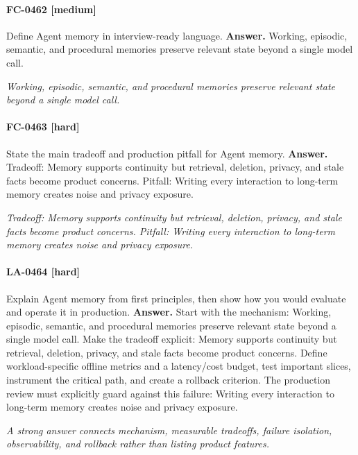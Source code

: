\paragraph{FC-0462 [medium]} Define Agent memory in interview-ready language.
\noindent\textbf{Answer.} Working, episodic, semantic, and procedural memories preserve relevant state beyond a single model call.
\par\textit{Working, episodic, semantic, and procedural memories preserve relevant state beyond a single model call.}
\paragraph{FC-0463 [hard]} State the main tradeoff and production pitfall for Agent memory.
\noindent\textbf{Answer.} Tradeoff: Memory supports continuity but retrieval, deletion, privacy, and stale facts become product concerns. Pitfall: Writing every interaction to long-term memory creates noise and privacy exposure.
\par\textit{Tradeoff: Memory supports continuity but retrieval, deletion, privacy, and stale facts become product concerns. Pitfall: Writing every interaction to long-term memory creates noise and privacy exposure.}
\paragraph{LA-0464 [hard]} Explain Agent memory from first principles, then show how you would evaluate and operate it in production.
\noindent\textbf{Answer.} Start with the mechanism: Working, episodic, semantic, and procedural memories preserve relevant state beyond a single model call. Make the tradeoff explicit: Memory supports continuity but retrieval, deletion, privacy, and stale facts become product concerns. Define workload-specific offline metrics and a latency/cost budget, test important slices, instrument the critical path, and create a rollback criterion. The production review must explicitly guard against this failure: Writing every interaction to long-term memory creates noise and privacy exposure.
\par\textit{A strong answer connects mechanism, measurable tradeoffs, failure isolation, observability, and rollback rather than listing product features.}
